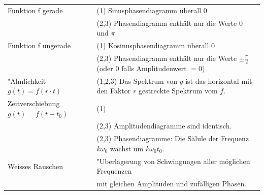 \begin{tabular}{ll}
	Funktion f gerade 
	& (1) Sinusphasendiagramm überall 0 \\
	& (2,3) Phasendiagramm enthält nur die Werte $0$ und $\pi$ \\
	Funktion f ungerade
	& (1) Kosinusphasendiagramm überall 0 \\
	& (2,3) Phasendiagramm enthält nur die Werte $\pm \frac{\pi}{2}$ (oder $0$ falls Amplitudenwert $=0$) \\
	"Ahnlichkeit $g(t) = f(r \cdot t) $
	& (1,2,3) Das Spektrum von $g$ ist das horizontal mit den Faktor $r$ gestreckte Spektrum vom $f$. \\
	Zeitverschiebung $g(t) = f(t + t_0) $
	& (1) \verweis{Fourier_Zeitverschiebung}{Zeitverschiebung} \\
	& (2,3) Amplitudendiagramme sind identisch. \\
	& (2,3) Phasendiagramme: Die Sälule der Frequenz $k \omega_0$ wächst um $k\omega_0 t_0$. \\
	Weisses Rauschen
	& "Uberlagerung von Schwingungen aller möglichen Frequenzen \\
	& mit gleichen Amplituden und zufälligen Phasen. 
\end{tabular}
\vspace{-\baselineskip}